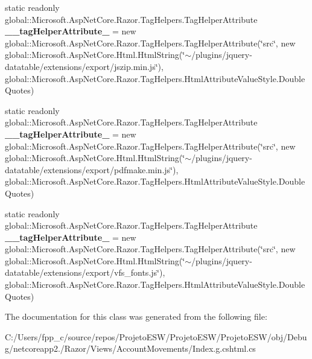 \begin{DoxyCompactItemize}
static readonly global\+::\+Microsoft.\+Asp\+Net\+Core.\+Razor.\+Tag\+Helpers.\+Tag\+Helper\+Attribute {\bfseries \+\_\+\+\_\+tag\+Helper\+Attribute\+\_} = new global\+::\+Microsoft.\+Asp\+Net\+Core.\+Razor.\+Tag\+Helpers.\+Tag\+Helper\+Attribute(\char`\"{}src\char`\"{}, new global\+::\+Microsoft.\+Asp\+Net\+Core.\+Html.\+Html\+String(\char`\"{}$\sim$/plugins/jquery-\/datatable/extensions/export/jszip.\+min.\+js\char`\"{}), global\+::\+Microsoft.\+Asp\+Net\+Core.\+Razor.\+Tag\+Helpers.\+Html\+Attribute\+Value\+Style.\+Double\+Quotes)
\item 
\mbox{\label{class_asp_net_core_1_1_views___account_movements___index_a296522e39cf83f74504385b77380ef9e}} 
static readonly global\+::\+Microsoft.\+Asp\+Net\+Core.\+Razor.\+Tag\+Helpers.\+Tag\+Helper\+Attribute {\bfseries \+\_\+\+\_\+tag\+Helper\+Attribute\+\_} = new global\+::\+Microsoft.\+Asp\+Net\+Core.\+Razor.\+Tag\+Helpers.\+Tag\+Helper\+Attribute(\char`\"{}src\char`\"{}, new global\+::\+Microsoft.\+Asp\+Net\+Core.\+Html.\+Html\+String(\char`\"{}$\sim$/plugins/jquery-\/datatable/extensions/export/pdfmake.\+min.\+js\char`\"{}), global\+::\+Microsoft.\+Asp\+Net\+Core.\+Razor.\+Tag\+Helpers.\+Html\+Attribute\+Value\+Style.\+Double\+Quotes)
\item 
\mbox{\label{class_asp_net_core_1_1_views___account_movements___index_ab76bc1cfbd9b101e028e8e7579142396}} 
static readonly global\+::\+Microsoft.\+Asp\+Net\+Core.\+Razor.\+Tag\+Helpers.\+Tag\+Helper\+Attribute {\bfseries \+\_\+\+\_\+tag\+Helper\+Attribute\+\_} = new global\+::\+Microsoft.\+Asp\+Net\+Core.\+Razor.\+Tag\+Helpers.\+Tag\+Helper\+Attribute(\char`\"{}src\char`\"{}, new global\+::\+Microsoft.\+Asp\+Net\+Core.\+Html.\+Html\+String(\char`\"{}$\sim$/plugins/jquery-\/datatable/extensions/export/vfs\+\_\+fonts.\+js\char`\"{}), global\+::\+Microsoft.\+Asp\+Net\+Core.\+Razor.\+Tag\+Helpers.\+Html\+Attribute\+Value\+Style.\+Double\+Quotes)
\end{DoxyCompactItemize}


The documentation for this class was generated from the following file\+:\begin{DoxyCompactItemize}
\item 
C\+:/\+Users/fpp\+\_\+c/source/repos/\+Projeto\+E\+S\+W/\+Projeto\+E\+S\+W/\+Projeto\+E\+S\+W/obj/\+Debug/netcoreapp2./\+Razor/\+Views/\+Account\+Movements/Index.\+g.\+cshtml.\+cs\end{DoxyCompactItemize}
